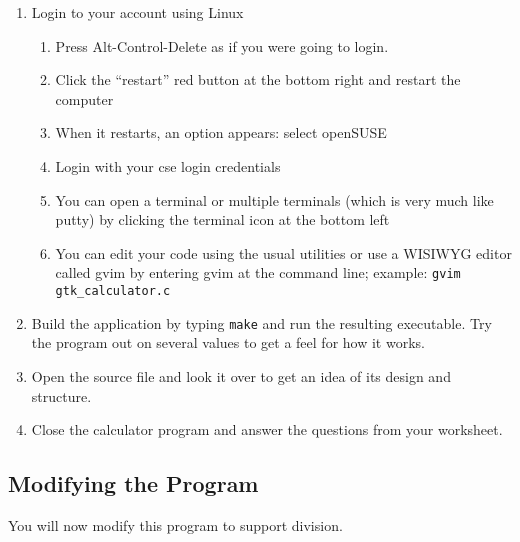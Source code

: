 \documentclass[12pt]{scrartcl}
\begin{document}
\begin{enumerate}
  \item Login to your account using Linux
  \begin{enumerate}
    \item Press Alt-Control-Delete as if you were going to login.
    \item Click the ``restart'' red button at the bottom right and 
    	restart the computer
    \item When it restarts, an option appears: select openSUSE
    \item Login with your cse login credentials
    \item You can open a terminal or multiple terminals (which is very 
    	much like putty) by clicking the terminal icon at the bottom left
    \item You can edit your code using the usual utilities or use a 
    	WISIWYG editor called gvim by entering gvim at the command line; 
	example: \texttt{gvim gtk_calculator.c}
  \end{enumerate}
  \item Build the application by typing \texttt{make} and 
  	run the resulting executable.  Try the program out on several 
	values to get a feel for how it works.
  \item Open the source file and look it over to get an idea of its design 
  	and structure.
  \item Close the calculator program and answer the questions from 
  	your worksheet.
\end{enumerate}
	
\subsection{Modifying the Program}

You will now modify this program to support division.
\end{document}
